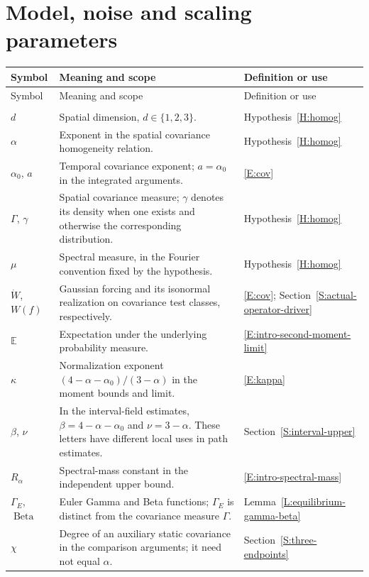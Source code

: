 \section*{Model, noise and scaling parameters}
\begin{longtable}{@{}>{\raggedright\arraybackslash}p{}
  >{\raggedright\arraybackslash}p{}
  >{\raggedright\arraybackslash}p{}@{}}
  \toprule
  Symbol & Meaning and scope & Definition or use \\
  \midrule
  \endfirsthead
  \toprule
  Symbol & Meaning and scope & Definition or use \\
  \midrule
  \endhead
  \midrule
  \multicolumn{3}{r}{\emph{Continued on the next page}} \\
  \endfoot
  \bottomrule
  \endlastfoot
  $d$ &
  Spatial dimension, $d \in \{1, 2, 3\}$. &
  Hypothesis~\ref{H:homog} \\[5pt]
  $\alpha$ &
  Exponent in the spatial covariance homogeneity relation. &
  Hypothesis~\ref{H:homog} \\[5pt]
  $\alpha_0$, $a$ &
  Temporal covariance exponent; $a = \alpha_0$ in the integrated arguments. &
  \eqref{E:cov} \\[5pt]
  $\Gamma$, $\gamma$ &
  Spatial covariance measure; $\gamma$ denotes its density when one exists and
  otherwise the corresponding distribution. &
  Hypothesis~\ref{H:homog} \\[5pt]
  $\mu$ &
  Spectral measure, in the Fourier convention fixed by the hypothesis. &
  Hypothesis~\ref{H:homog} \\[5pt]
  $\dot W$, $W(f)$ &
  Gaussian forcing and its isonormal realization on covariance test classes,
  respectively. &
  \eqref{E:cov}; Section~\ref{S:actual-operator-driver} \\[5pt]
  $\mathbb{E}$ &
  Expectation under the underlying probability measure. &
  \eqref{E:intro-second-moment-limit} \\[5pt]
  $\kappa$ &
  Normalization exponent $(4 - \alpha - \alpha_0)/(3 - \alpha)$ in the moment
  bounds and limit. &
  \eqref{E:kappa} \\[5pt]
  $\beta$, $\nu$ &
  In the interval-field estimates, $\beta = 4 - \alpha - \alpha_0$ and $\nu = 3
  - \alpha$. These letters have different local uses in path estimates. &
  Section~\ref{S:interval-upper} \\[5pt]
  $R_\alpha$ &
  Spectral-mass constant in the independent upper bound. &
  \eqref{E:intro-spectral-mass} \\[5pt]
  $\Gamma_E$, $\operatorname{Beta}$ &
  Euler Gamma and Beta functions; $\Gamma_E$ is distinct from the covariance
  measure $\Gamma$. &
  Lemma~\ref{L:equilibrium-gamma-beta} \\[5pt]
  $\chi$ &
  Degree of an auxiliary static covariance in the comparison arguments; it need
  not equal $\alpha$. &
  Section~\ref{S:three-endpoints} \\[5pt]
\end{longtable}


